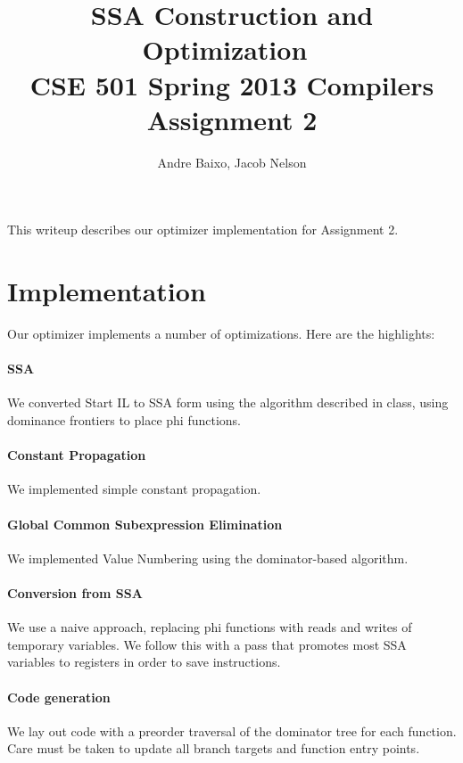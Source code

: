 \documentclass[10pt,twocolumn]{article}
\begin{document}
\title{SSA Construction and Optimization\ \\
  \small CSE 501 Spring 2013 Compilers Assignment 2}
\author{Andre Baixo, Jacob Nelson}
\maketitle

This writeup describes our optimizer implementation for Assignment 2.

\section{Implementation}

Our optimizer implements a number of optimizations. Here are the highlights:

\paragraph{SSA} 
We converted Start IL to SSA form using the algorithm described in
class, using dominance frontiers to place phi functions.

\paragraph{Constant Propagation} 
We implemented simple constant propagation.

\paragraph{Global Common Subexpression Elimination} 
We implemented Value Numbering using the dominator-based algorithm.

\paragraph{Conversion from SSA} 
We use a naive approach, replacing phi functions with reads and writes
of temporary variables. We follow this with a pass that promotes most
SSA variables to registers in order to save instructions.

\paragraph{Code generation} 
We lay out code with a preorder traversal of the dominator tree for
each function. Care must be taken to update all branch targets and
function entry points.
\end{document}
